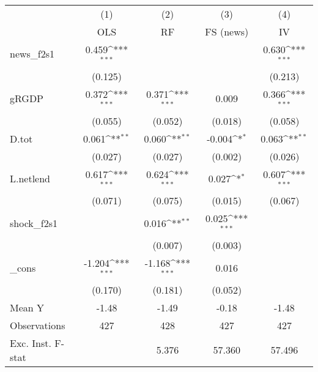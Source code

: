 {
\def\sym#1{\ifmmode^{#1}\else\(^{#1}\)\fi}
\begin{tabular}{l*{4}{c}}
\toprule
            &\multicolumn{1}{c}{(1)}&\multicolumn{1}{c}{(2)}&\multicolumn{1}{c}{(3)}&\multicolumn{1}{c}{(4)}\\
            &\multicolumn{1}{c}{OLS}&\multicolumn{1}{c}{RF}&\multicolumn{1}{c}{FS (news)}&\multicolumn{1}{c}{IV}\\
\midrule
news\_f2s1   &       0.459\sym{***}&                     &                     &       0.630\sym{***}\\
            &     (0.125)         &                     &                     &     (0.213)         \\
\addlinespace
gRGDP       &       0.372\sym{***}&       0.371\sym{***}&       0.009         &       0.366\sym{***}\\
            &     (0.055)         &     (0.052)         &     (0.018)         &     (0.058)         \\
\addlinespace
D.tot       &       0.061\sym{**} &       0.060\sym{**} &      -0.004\sym{*}  &       0.063\sym{**} \\
            &     (0.027)         &     (0.027)         &     (0.002)         &     (0.026)         \\
\addlinespace
L.netlend   &       0.617\sym{***}&       0.624\sym{***}&       0.027\sym{*}  &       0.607\sym{***}\\
            &     (0.071)         &     (0.075)         &     (0.015)         &     (0.067)         \\
\addlinespace
shock\_f2s1  &                     &       0.016\sym{**} &       0.025\sym{***}&                     \\
            &                     &     (0.007)         &     (0.003)         &                     \\
\addlinespace
\_cons      &      -1.204\sym{***}&      -1.168\sym{***}&       0.016         &                     \\
            &     (0.170)         &     (0.181)         &     (0.052)         &                     \\
\midrule
Mean Y      &       -1.48         &       -1.49         &       -0.18         &       -1.48         \\
Observations&         427         &         428         &         427         &         427         \\
Exc. Inst. F-stat&                     &       5.376         &      57.360         &      57.496         \\
\bottomrule
\end{tabular}
}
